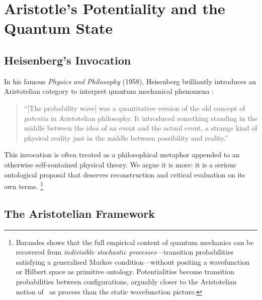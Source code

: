 \section{Aristotle's Potentiality and the Quantum State}
\label{section:aristotle}

\subsection{Heisenberg's Invocation}

In his famous \textit{Physics and Philosophy} (1958), Heisenberg brilliantly introduces an Aristotelian category to interpret quantum mechanical phenomena \cite{heisenberg_1958_physics}:

\begin{quote}
  ``[The probability wave] was a quantitative version of the old concept of \textit{potentia} in Aristotelian philosophy. It introduced something standing in the middle between the idea of an event and the actual event, a strange kind of physical reality just in the middle between possibility and reality.''
\end{quote}

This invocation is often treated as a philosophical metaphor appended to an otherwise self-contained physical theory. We argue it is more: it is a serious ontological proposal that deserves reconstruction and critical evaluation on its own terms. \footnote{Barandes \cite{barandes_2023_stochastic} shows that the full empirical content of quantum mechanics can be recovered from \textit{indivisible stochastic processes}---transition probabilities satisfying a generalised Markov condition---without positing a wavefunction or Hilbert space as primitive ontology. Potentialities become transition probabilities between configurations, arguably closer to the Aristotelian notion of \dunamis\ as process than the static wavefunction picture.}

\medskip


\subsection{The Aristotelian Framework}

